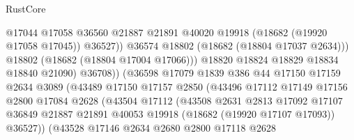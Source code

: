 \begin{lexlean}{RustCore}
\begin{coremodule}
                                        @17044
                                        @17058
                                        @36560
                                        @21887
                                        @21891
                                        @40020
                                        @19918
                                        (@18682 (@19920 @17058 @17045))
                                        @36527))
                                    @36574
                                    @18802
                                    (@18682 (@18804 @17037 @2634)))
                                  @18802
                                  (@18682 (@18804 @17004 @17066)))
                                @18820
                                @18824
                                @18829
                                @18834
                                @18840
                                @21090)
                              @36708))
                          (@36598
                            @17079
                            @1839
                            @386
                            @44
                            @17150
                            @17159
                            @2634
                            @3089
                            (@43489
                              @17150
                              @17157
                              @2850
                              (@43496
                                @17112
                                @17149
                                @17156
                                @2800
                                @17084
                                @2628
                                (@43504
                                  @17112
                                  (@43508
                                    @2631
                                    @2813
                                    @17092
                                    @17107
                                    @36849
                                    @21887
                                    @21891
                                    @40053
                                    @19918
                                    (@18682 (@19920 @17107 @17093))
                                    @36527))
                                (@43528
                                  @17146
                                  @2634
                                  @2680
                                  @2800
                                  @17118
                                  @2628

\end{coremodule}
\end{lexlean}
